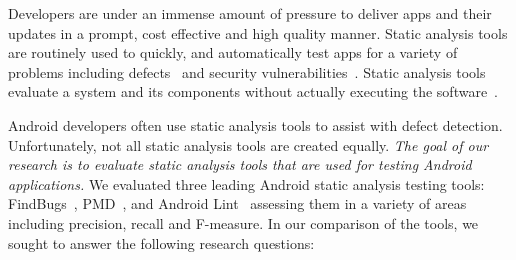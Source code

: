 \documentclass{sig-alternate}
\newcommand{\todo}[1]{\textcolor{cyan}{\textbf{[#1]}}}
\begin{document}
Developers are under an immense amount of pressure to deliver apps and their updates in a prompt, cost effective and high quality manner. Static analysis tools are routinely used to quickly, and automatically test apps for a variety of problems including defects~\cite{johnson2013don} and security vulnerabilities~\cite{Ware:2008:SJC:1394504.1394506, song2015finding}. Static analysis tools evaluate a system and its components without actually executing the software~\cite{159342}.

Android developers often use static analysis tools to assist with defect detection. Unfortunately, not all static analysis tools are created equally. \emph{The goal of our research is to evaluate static analysis tools that are used for testing Android applications.} We evaluated three leading Android static analysis testing tools: FindBugs~\cite{FindBugs_URL}, PMD~\cite{Rutar:2004:CBF:1032654.1033833}, and Android Lint~\cite{AndroidLint_URL} assessing them in a variety of areas including precision, recall and F-measure. In our comparison of the tools, we sought to answer the following research questions:\\



\end{document}
